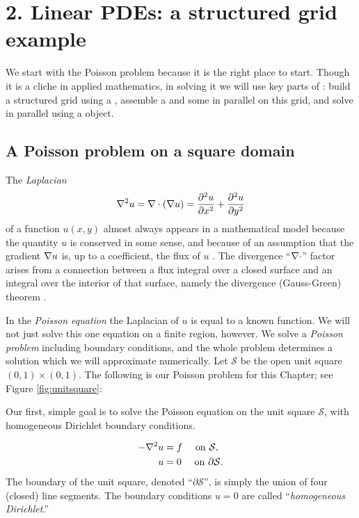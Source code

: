
\chapter{2. Linear PDEs: a structured grid example}

We start with the Poisson problem because it is the right place to start.  Though it is a cliche in applied mathematics, in solving it we will use key parts of \PETSc: build a structured grid using a \PETSc \pDMDA, assemble a \pMat and some \pVecs in parallel on this grid, and solve in parallel using a \pKSP object.

\section{A Poisson problem on a square domain}

The \emph{Laplacian}
    $$\nabla^2 u = \nabla\cdot(\nabla u) = \frac{\partial^2 u}{\partial x^2} + \frac{\partial^2 u}{\partial y^2}$$
of a function $u(x,y)$ almost always appears in a mathematical model because the quantity $u$ is conserved in some sense, and because of an assumption that the gradient $\nabla u$ is, up to a coefficient, the flux of $u$ \citep{Ockendonetal2003}.  The divergence ``$\nabla\cdot$'' factor arises from a connection between a flux integral over a closed surface and an integral over the interior of that surface, namely the divergence (Gauss-Green) theorem \citep[Appendix C]{Evans}.

In the \emph{Poisson equation} the Laplacian of $u$ is equal to a known function.  We will not just solve this one equation on a finite region, however.  We solve a \emph{Poisson problem} including boundary conditions, and the whole problem determines a solution which we will approximate numerically.  Let $\mathcal{S}$ be the open unit square $(0,1)\times(0,1)$.  The following is our Poisson problem for this Chapter;  see Figure \ref{fig:unitsquare}:
\begin{marginfigure}
\caption{Our first, simple goal is to solve the Poisson equation on the unit square $\mathcal{S}$, with homogeneous Dirichlet boundary conditions.}
\label{fig:unitsquare}
\end{marginfigure}
\begin{align}
- \nabla^2 u &= f \quad \text{ on } \mathcal{S}, \label{poissonsquare} \\
u &= 0 \quad \text{ on } \partial \mathcal{S}. \notag
\end{align}
The boundary of the unit square, denoted ``$\partial\mathcal{S}$'', is simply the union of four (closed) line segments.  The boundary conditions $u=0$ are called ``\emph{homogeneous Dirichlet}.''

